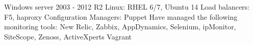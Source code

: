 Windows server 2003 - 2012 R2
Linux: RHEL 6/7, Ubuntu 14
Load balancers: F5, haproxy
Configuration Managers: Puppet
Have managed the following monitoring tools: New Relic, Zabbix, AppDynamics, Selenium, ipMonitor, SiteScope, Zenoss, ActiveXperts
Vagrant